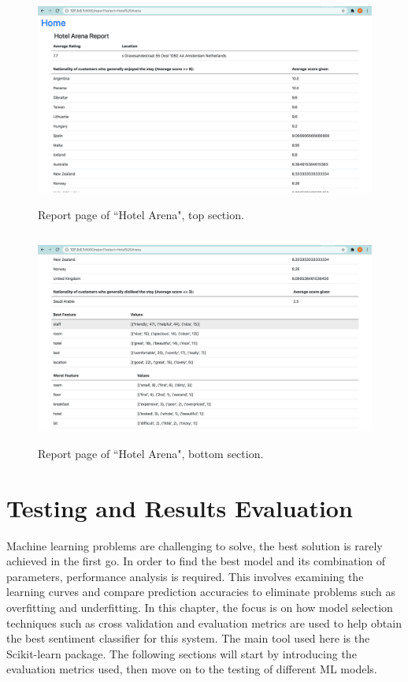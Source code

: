 \documentclass[a4paper]{report}
\begin{document}
{\begin{figure}[h]
\includegraphics[width=\textwidth, height=7cm, keepaspectratio]{user_manual_2.png}
\centering
\caption{Report page of “Hotel Arena", top section.}
\label{figure:user_manual_2}
\end{figure}

{\begin{figure}[h]
\includegraphics[width=\textwidth, height=7cm, keepaspectratio]{user_manual_3.png}
\centering
\caption{Report page of “Hotel Arena", bottom section.}
\label{figure:user_manual_3}
\end{figure}



\chapter{Testing and Results Evaluation}
Machine learning problems are challenging to solve, the best solution is rarely achieved in the first go. In order to find the best model and its combination of parameters, performance analysis is required. This involves examining the learning curves and compare prediction accuracies to eliminate problems such as overfitting and underfitting. In this chapter, the focus is on how model selection techniques such as cross validation and evaluation metrics are used to help obtain the best sentiment classifier for this system. The main tool used here is the Scikit-learn package. 
The following sections will start by introducing the evaluation metrics used, then move on to the testing of different ML models.

}}
\end{document}
